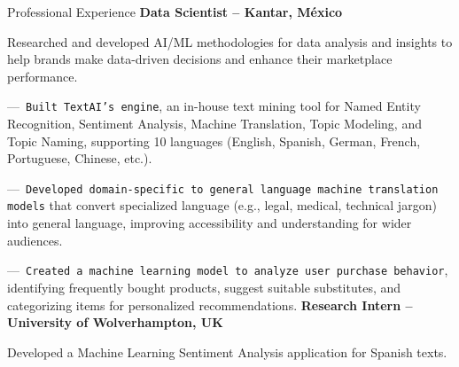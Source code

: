 \begin{rubric}{Professional Experience}
\entry*[06.2018 -- 09.2021]%
	\textbf{Data Scientist -- Kantar, México}
 
Researched and developed AI/ML methodologies for data analysis and insights to help brands make data-driven decisions and enhance their marketplace performance.\par\par
%
---~\texttt{Built TextAI’s engine}, an in-house text mining tool for Named Entity Recognition, Sentiment Analysis, Machine Translation, Topic Modeling, and Topic Naming, supporting 10 languages (English, Spanish, German, French, Portuguese, Chinese, etc.).\par

---~\texttt{Developed domain-specific to general language machine translation models} that convert specialized language (e.g., legal, medical, technical jargon) into general language, improving accessibility and understanding for wider audiences.\par

---~\texttt{Created a machine learning model to analyze user purchase behavior}, identifying frequently bought products, suggest suitable substitutes, and categorizing items for personalized recommendations. 
%
%
\entry*[02.2017 -- 08.2017]%
	\textbf{Research Intern -- University of Wolverhampton, UK}
 
 Developed a Machine Learning Sentiment Analysis application for Spanish texts.
%
\end{rubric}